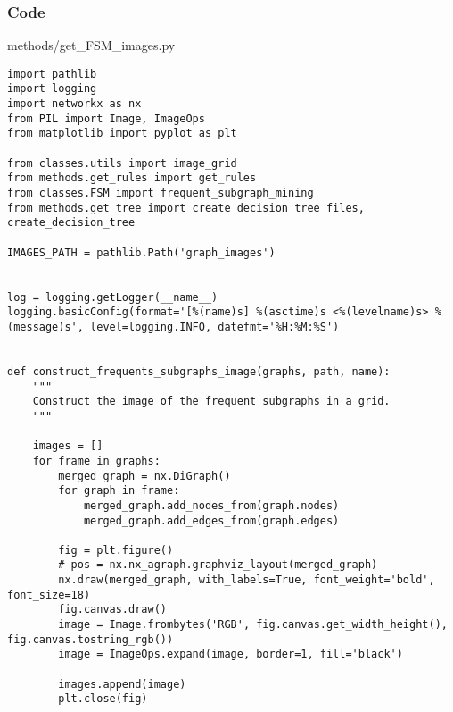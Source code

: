 \documentclass{beamer}
\begin{document}

\begin{frame}[fragile]
    \frametitle{Code}
    \scriptsize
    methods/get\_FSM\_images.py \newline
    \fontsize{3pt}{5pt}\selectfont
    \begin{verbatim}
import pathlib
import logging
import networkx as nx
from PIL import Image, ImageOps
from matplotlib import pyplot as plt

from classes.utils import image_grid
from methods.get_rules import get_rules
from classes.FSM import frequent_subgraph_mining
from methods.get_tree import create_decision_tree_files, create_decision_tree

IMAGES_PATH = pathlib.Path('graph_images')


log = logging.getLogger(__name__)
logging.basicConfig(format='[%(name)s] %(asctime)s <%(levelname)s> %(message)s', level=logging.INFO, datefmt='%H:%M:%S')


def construct_frequents_subgraphs_image(graphs, path, name):
    """
    Construct the image of the frequent subgraphs in a grid.
    """
    
    images = []
    for frame in graphs:
        merged_graph = nx.DiGraph()
        for graph in frame:
            merged_graph.add_nodes_from(graph.nodes)
            merged_graph.add_edges_from(graph.edges)
            
        fig = plt.figure()
        # pos = nx.nx_agraph.graphviz_layout(merged_graph)
        nx.draw(merged_graph, with_labels=True, font_weight='bold', font_size=18)
        fig.canvas.draw()
        image = Image.frombytes('RGB', fig.canvas.get_width_height(), fig.canvas.tostring_rgb())
        image = ImageOps.expand(image, border=1, fill='black')

        images.append(image)
        plt.close(fig)
    \end{verbatim}
\end{frame}
\end{document}
